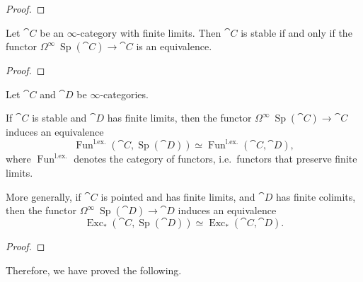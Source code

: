 \begin{proof}
    \nyw
\end{proof}

\begin{proposition}
    Let $\cat{C}$ be an $\infty$-category with finite limits.
    Then $\cat{C}$ is stable if and only if the functor 
    $\Omega^\infty\:\operatorname{Sp}(\cat{C})\to\cat{C}$
    is an equivalence.
\end{proposition}

\begin{proof}
    \nyw
\end{proof}

\begin{proposition}
    Let $\cat{C}$ and $\cat{D}$ be $\infty$-categories.

    \begin{itms}
        \item 
        If $\cat{C}$ is stable and $\cat{D}$ has finite limits,
        then the functor $\Omega^\infty\:\operatorname{Sp}(\cat{C})\to\cat{C}$
        induces an equivalence
        \[\operatorname{Fun}^{\mathrm{l.ex.}}(\cat{C},\operatorname{Sp}(\cat{D}))
        \simeq\operatorname{Fun}^{\mathrm{l.ex.}}(\cat{C},\cat{D}),\]
        where $\operatorname{Fun}^{\mathrm{l.ex.}}$
        denotes the category of  functors,
        i.e.\ functors that preserve finite limits.
        \item 
        More generally, if $\cat{C}$ is pointed and has finite limits,
        and $\cat{D}$ has finite colimits, then the functor
        $\Omega^\infty\:\operatorname{Sp}(\cat{D})\to\cat{D}$
        induces an equivalence
        \[\operatorname{Exc}_*(\cat{C},\operatorname{Sp}(\cat{D}))
        \simeq\operatorname{Exc}_*(\cat{C},\cat{D}).\]
    \end{itms}
\end{proposition}

\begin{proof}
    \nyw
\end{proof}

Therefore, we have proved the following.

